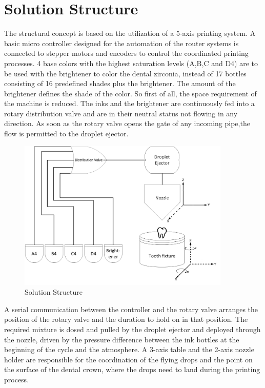 \chapter{Solution Structure}
The structural concept is based on the utilization of a 5-axis printing system. A basic micro controller designed for the automation of the router systems is connected to stepper motors and encoders to control the coordinated printing processes. 4 base colors with the highest saturation levels (A,B,C and D4) are to be used with the brightener to color the dental zirconia, instead of 17 bottles consisting of 16 predefined shades plus the brightener. The amount of the brightener defines the shade of the color. So  first of all, the space requirement of the machine is reduced. The inks and the brightener are continuously fed into a rotary distribution valve and are in their neutral status not flowing in any direction. As soon as the rotary valve opens the gate of any incoming pipe,the flow is permitted to the droplet ejector.  
\newline
\begin{figure}[h]
	\centering
	\includegraphics[width=0.9\textwidth]{grafiken/SolutionStructure.jpg}
	\caption{Solution Structure}
	\label{fig:SolutionStructure}
\end{figure} 
\newline
A serial communication between the controller and the rotary valve arranges the position of the rotary valve and the duration to hold on in that position. The required mixture is dosed and pulled by the droplet ejector and deployed through the nozzle, driven by the pressure difference between the ink bottles at the beginning of the cycle and the atmosphere. A 3-axis table and the 2-axis nozzle holder are responsible for the coordination of the flying drops and the point on the surface of the dental crown, where the drops need to land during the printing process.

